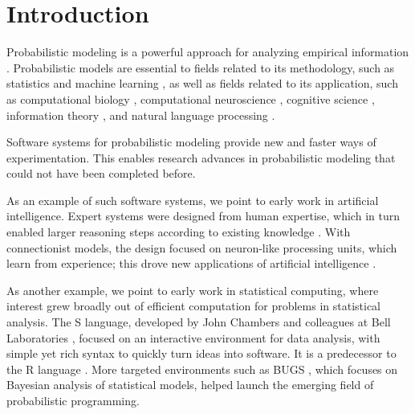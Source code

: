 \section{Introduction}
\label{sec:intro}

Probabilistic modeling is a powerful approach for analyzing empirical
information \citep{tukey1962future,newell1976computer,box1976science}.
Probabilistic models are essential to fields related to its
methodology, such as
statistics \citep{friedman2001elements,gelman2013bayesian} and machine
learning \citep{murphy2012machine,goodfellow2016deep}, as well as
fields related to its application, such as computational
biology \citep{friedman2000using}, computational
neuroscience \citep{dayan2001theoretical}, cognitive
science \citep{tenenbaum2011grow}, information
theory \citep{mackay2003information}, and natural language
processing \citep{manning1999foundations}.

Software systems for probabilistic modeling provide new and faster
ways of experimentation. This enables research advances in
probabilistic modeling that could not have been completed before.

As an example of such software systems, we point to early work in
artificial intelligence.
Expert systems were designed from human expertise, which in
turn enabled larger reasoning steps according to existing
knowledge \citep{buchanan1969heuristic,minsky1975framework}.  With
connectionist models, the design focused on neuron-like processing
units, which learn from experience;
this drove new applications of artificial intelligence
\citep{hopfield1982neural,rumelhart1988parallel}.

As another example, we point to early work in
statistical computing, where interest grew broadly out of efficient
computation for problems in statistical analysis. The S language,
developed by John Chambers and colleagues at Bell
Laboratories \citep{becker1984s,chambers1992statistical}, focused on
an interactive environment for data analysis, with simple yet rich
syntax to quickly turn ideas into software. It is a
predecessor to the R language \citep{ihaka1996r}.  More targeted environments
such as BUGS \citep{spiegelhalter1995bugs},
which focuses on Bayesian analysis of statistical models, helped launch
the emerging field of probabilistic programming.

